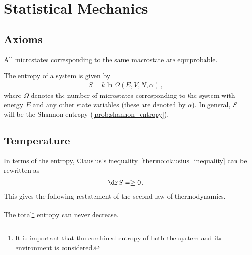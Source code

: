 \chapter{Statistical Mechanics}

    \minitoc

\section{Axioms}

    \begin{axiom}
        All microstates corresponding to the same macrostate are equiprobable.
    \end{axiom}

    \begin{axiom}\label{statmech:boltzmann_formula}
        The entropy of a system is given by
        \begin{gather}
            S = k\ln\Omega(E,V,N,\alpha)\,,
        \end{gather}
        where $\Omega$ denotes the number of microstates corresponding to the system with energy $E$ and any other state variables (these are denoted by $\alpha$). In general, $S$ will be the Shannon entropy (\cref{prob:shannon_entropy}).
    \end{axiom}

\section{Temperature}


    In terms of the entropy, Clausius's inequality~\ref{thermo:clausius_inequality} can be rewritten as
    \begin{gather}
        \dr S = \geq 0\,.
    \end{gather}
    This gives the following restatement of the second law of thermodynamics.
    \begin{axiom}
        The total\footnote{It is important that the combined entropy of both the system and its environment is considered.} entropy can never decrease.
    \end{axiom}

